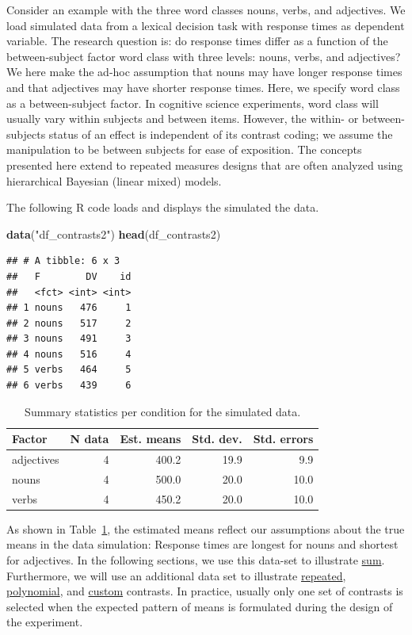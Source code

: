 \documentclass[12pt,]{krantz}
\newenvironment{Shaded}{\begin{snugshade}}{\end{snugshade}}
\newcommand{\KeywordTok}[1]{\textcolor[rgb]{0.13,0.29,0.53}{\textbf{#1}}}
\newcommand{\NormalTok}[1]{#1}
\newcommand{\StringTok}[1]{\textcolor[rgb]{0.31,0.60,0.02}{#1}}
\begin{document}
Consider an example with the three word classes nouns, verbs, and adjectives. We load simulated data from a lexical decision task with response times as dependent variable. The research question is: do response times differ as a function of the between-subject factor word class with three levels: nouns, verbs, and adjectives? We here make the ad-hoc assumption that nouns may have longer response times and that adjectives may have shorter response times. Here, we specify word class as a between-subject factor. In cognitive science experiments, word class will usually vary within subjects and between items. However, the within- or between-subjects status of an effect is independent of its contrast coding; we assume the manipulation to be between subjects for ease of exposition. The concepts presented here extend to repeated measures designs that are often analyzed using hierarchical Bayesian (linear mixed) models.

The following R code loads and displays the simulated the data.

\begin{Shaded}
\begin{Highlighting}[]
\KeywordTok{data}\NormalTok{(}\StringTok{"df_contrasts2"}\NormalTok{)}
\KeywordTok{head}\NormalTok{(df_contrasts2)}
\end{Highlighting}
\end{Shaded}

\begin{verbatim}
## # A tibble: 6 x 3
##   F        DV    id
##   <fct> <int> <int>
## 1 nouns   476     1
## 2 nouns   517     2
## 3 nouns   491     3
## 4 nouns   516     4
## 5 verbs   464     5
## 6 verbs   439     6
\end{verbatim}

\begin{table}[b]

\caption{\label{tab:cTab2Means}Summary statistics per condition for the simulated data.}
\centering
\begin{tabular}[t]{l|r|r|r|r}
\hline
Factor & N data & Est. means & Std. dev. & Std. errors\\
\hline
adjectives & 4 & 400.2 & 19.9 & 9.9\\
\hline
nouns & 4 & 500.0 & 20.0 & 10.0\\
\hline
verbs & 4 & 450.2 & 20.0 & 10.0\\
\hline
\end{tabular}
\end{table}

As shown in Table~\ref{tab:cTab2Means}, the estimated means reflect our assumptions about the true means in the data simulation: Response times are longest for nouns and shortest for adjectives.
In the following sections, we use this data-set to illustrate \protect\hyperlink{sumcontrasts}{sum}. Furthermore, we will use an additional data set to illustrate \protect\hyperlink{repeatedcontrasts}{repeated}, \protect\hyperlink{polynomialContrasts}{polynomial}, and \protect\hyperlink{customContrasts}{custom} contrasts. In practice, usually only one set of contrasts is selected when the expected pattern of means is formulated during the design of the experiment.
\end{document}
